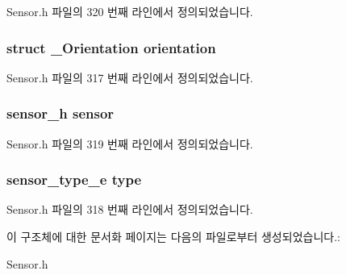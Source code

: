 Sensor.\-h 파일의 320 번째 라인에서 정의되었습니다.

\hypertarget{struct___orientation_extend_ad28b7e9f0c184d60aba7731570671894}{
\subsubsection[{orientation}]{\setlength{\rightskip}{0pt plus 5cm}struct {\bf \-\_\-\-Orientation} orientation}}\label{struct___orientation_extend_ad28b7e9f0c184d60aba7731570671894}


Sensor.\-h 파일의 317 번째 라인에서 정의되었습니다.

\hypertarget{struct___orientation_extend_a5bae9b7801bc3808411925cde81d3f26}{
\subsubsection[{sensor}]{\setlength{\rightskip}{0pt plus 5cm}sensor\-\_\-h sensor}}\label{struct___orientation_extend_a5bae9b7801bc3808411925cde81d3f26}


Sensor.\-h 파일의 319 번째 라인에서 정의되었습니다.

\hypertarget{struct___orientation_extend_abffb09766da2fc510a79bb51f82a36e1}{
\subsubsection[{type}]{\setlength{\rightskip}{0pt plus 5cm}sensor\-\_\-type\-\_\-e type}}\label{struct___orientation_extend_abffb09766da2fc510a79bb51f82a36e1}


Sensor.\-h 파일의 318 번째 라인에서 정의되었습니다.



이 구조체에 대한 문서화 페이지는 다음의 파일로부터 생성되었습니다.\-:\begin{DoxyCompactItemize}
\item 
Sensor.\-h\end{DoxyCompactItemize}
